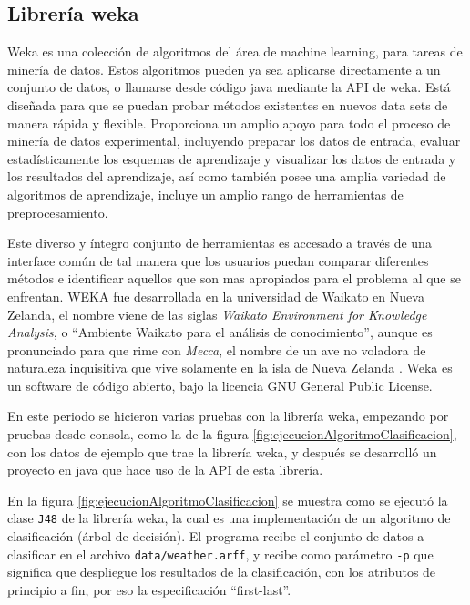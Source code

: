\subsection{Librería weka}
Weka es una colección de algoritmos del área de machine learning, para tareas de minería de datos. Estos algoritmos pueden ya sea aplicarse directamente a un conjunto de datos, o llamarse desde código java mediante la API de weka.
Está diseñada para que se puedan probar métodos existentes en nuevos data sets de manera rápida y flexible. Proporciona un amplio apoyo para todo el proceso de minería de datos experimental, incluyendo preparar los datos de entrada, evaluar estadísticamente los esquemas de aprendizaje y visualizar los datos de entrada y los resultados del aprendizaje, así como también posee una amplia variedad de algoritmos de aprendizaje, incluye un amplio rango de herramientas de preprocesamiento.

Este diverso y íntegro conjunto de herramientas es accesado a través de una interface común de tal manera que los usuarios puedan comparar diferentes métodos e identificar aquellos que son mas apropiados para el problema al que se enfrentan. WEKA fue desarrollada en la universidad de Waikato en Nueva Zelanda, el nombre viene de las siglas \textit{Waikato  Environment for Knowledge Analysis}, o ``Ambiente Waikato para el análisis de conocimiento'', aunque es pronunciado para que rime con \textit{Mecca}, el nombre de un ave no voladora de naturaleza inquisitiva que vive solamente en la isla de Nueva Zelanda \cite{EibeFMarkAHallIanHTheWekaWorkbench}.
Weka es un software de código abierto, bajo la licencia GNU General Public License.

En este periodo se hicieron varias pruebas con la librería weka, empezando por pruebas desde consola, como la de la figura \ref{fig:ejecucionAlgoritmoClasificacion}, con los datos de ejemplo que trae la librería weka, y después se desarrolló un proyecto en java que hace uso de la API de esta librería.

En la figura \ref{fig:ejecucionAlgoritmoClasificacion} se muestra como se ejecutó la clase \texttt{J48} de la librería weka, la cual es una implementación de un algoritmo de clasificación (árbol de decisión). 
El programa recibe el conjunto de datos a clasificar en el archivo \texttt{data/weather.arff}, y recibe como parámetro \texttt{-p} que significa que despliegue los resultados de la clasificación, con los atributos de principio a fin, por eso la especificación ``first-last''.

